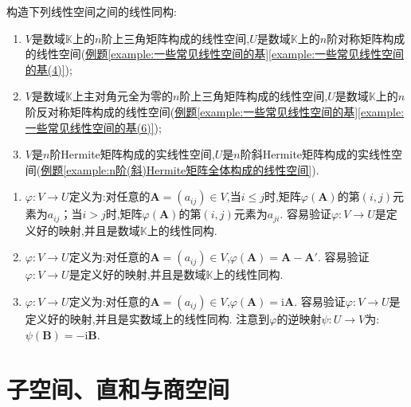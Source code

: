 \documentclass[lang=cn,newtx,10pt,scheme=chinese]{elegantbook}
\begin{document}
    \begin{exercise}
    构造下列线性空间之间的线性同构:
    \begin{enumerate}[(1)]
        \item \(V\)是数域\(\mathbb{K}\)上的\(n\)阶上三角矩阵构成的线性空间,\(U\)是数域\(\mathbb{K}\)上的\(n\)阶对称矩阵构成的线性空间(\hyperref[example:一些常见线性空间的基(4)]{例题\ref{example:一些常见线性空间的基}\ref{example:一些常见线性空间的基(4)}});
        \item \(V\)是数域\(\mathbb{K}\)上主对角元全为零的\(n\)阶上三角矩阵构成的线性空间,\(U\)是数域\(\mathbb{K}\)上的\(n\)阶反对称矩阵构成的线性空间(\hyperref[example:一些常见线性空间的基(6)]{例题\ref{example:一些常见线性空间的基}\ref{example:一些常见线性空间的基(6)}});
        \item \(V\)是\(n\)阶Hermite矩阵构成的实线性空间,\(U\)是\(n\)阶斜Hermite矩阵构成的实线性空间(\hyperref[example:n阶(斜)Hermite矩阵全体构成的线性空间]{例题\ref{example:n阶(斜)Hermite矩阵全体构成的线性空间}}).
    \end{enumerate}
    \end{exercise}
    \begin{solution}
    \begin{enumerate}[(1)]
        \item  \(\varphi:V\to U\)定义为:对任意的\(\boldsymbol{A}=(a_{ij})\in V\),当\(i\leq j\)时,矩阵\(\varphi(\boldsymbol{A})\)的第\((i,j)\)元素为\(a_{ij}\)；当\(i > j\)时,矩阵\(\varphi(\boldsymbol{A})\)的第\((i,j)\)元素为\(a_{ji}\). 容易验证\(\varphi:V\to U\)是定义好的映射,并且是数域\(\mathbb{K}\)上的线性同构.
        \item \(\varphi:V\to U\)定义为:对任意的\(\boldsymbol{A}=(a_{ij})\in V\),\(\varphi(\boldsymbol{A})=\boldsymbol{A}-\boldsymbol{A}'\). 容易验证\(\varphi:V\to U\)是定义好的映射,并且是数域\(\mathbb{K}\)上的线性同构.
        \item \(\varphi:V\to U\)定义为:对任意的\(\boldsymbol{A}=(a_{ij})\in V\),\(\varphi(\boldsymbol{A})=\mathrm{i}\boldsymbol{A}\). 容易验证\(\varphi:V\to U\)是定义好的映射,并且是实数域上的线性同构. 注意到\(\varphi\)的逆映射\(\psi:U\to V\)为:\(\psi(\boldsymbol{B})=-\mathrm{i}\boldsymbol{B}\). 
\end{enumerate}
\end{solution}


\section{子空间、直和与商空间}
\end{document}

